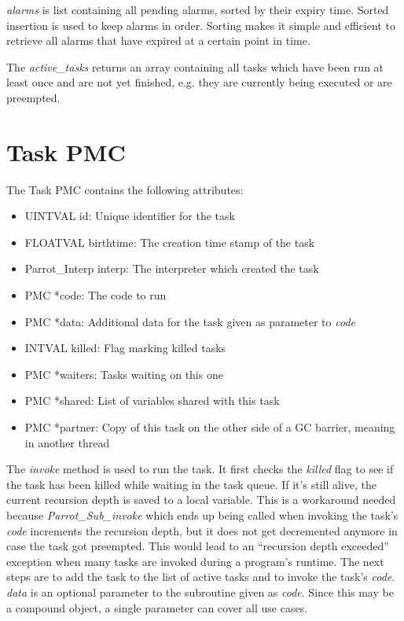 \documentclass[bachelor,english]{hgbthesis}
\begin{document}
\textit{alarms} is list containing all pending alarms, sorted by their expiry time. Sorted insertion is used to keep alarms in order. Sorting makes it simple and efficient to retrieve all alarms that have expired at a certain point in time.

The \textit{active\_tasks} returns an array containing all tasks which have been run at least once and are not yet finished, e.g. they are currently being executed or are preempted.

\section{Task PMC}

The Task PMC contains the following attributes:
%
\begin{itemize}
\item UINTVAL id: Unique identifier for the task
\item FLOATVAL birthtime: The creation time stamp of the task
\item Parrot\_Interp interp: The interpreter which created the task
\item PMC *code: The code to run
\item PMC *data: Additional data for the task given as parameter to \textit{code}
\item INTVAL killed: Flag marking killed tasks
\item PMC *waiters: Tasks waiting on this one
\item PMC *shared: List of variables shared with this task
\item PMC *partner: Copy of this task on the other side of a GC barrier, meaning in another thread
\end{itemize}

The \textit{invoke} method is used to run the task. It first checks the \textit{killed} flag to see if the task has been killed while waiting in the task queue. If it's still alive, the current recursion depth is saved to a local variable. This is a workaround needed because \textit{Parrot\_Sub\_invoke} which ends up being called when invoking the task's \textit{code} increments the recursion depth, but it does not get decremented anymore in case the task got preempted. This would lead to an ``recursion depth exceeded'' exception when many tasks are invoked during a program's runtime. The next steps are to add the task to the list of active tasks and to invoke the task's \textit{code}. \textit{data} is an optional parameter to the subroutine given as \textit{code}. Since this may be a compound object, a single parameter can cover all use cases.
\end{document}
